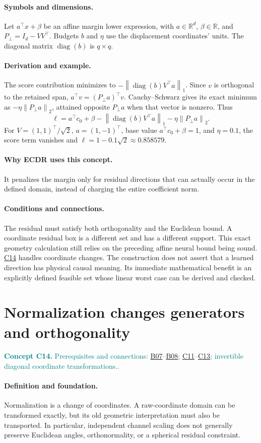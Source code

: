 \documentclass[11pt,a4paper]{article}
\newcommand{\R}{\mathbb R}
\newcommand{\norm}[1]{\left\lVert#1\right\rVert}
\newcommand{\diag}{\operatorname{diag}}
\newcommand{\conceptid}{Front matter}
\newcommand{\concept}[3]{\clearpage\renewcommand{\conceptid}{#1}%
\section{#2}\label{concept:#1}%
\textcolor{teal}{\textbf{Concept #1.} Prerequisites and connections: #3.}\par
\typeout{ECDR-CONCEPT-START #1 PAGE=\thepage}}
\begin{document}
\paragraph{Symbols and dimensions.}
Let $a^\top x+\beta$ be an affine margin lower expression, with $a\in\R^d$, $\beta\in\R$, and $P_\perp=I_d-VV^\top$. Budgets $b$ and $\eta$ use the displacement coordinates' units. The diagonal matrix $\diag(b)$ is $q\times q$.
\paragraph{Derivation and example.}
The score contribution minimizes to $-\norm{\diag(b)V^\top a}_1$. Since $v$ is orthogonal to the retained span, $a^\top v=(P_\perp a)^\top v$. Cauchy--Schwarz gives its exact minimum as $-\eta\norm{P_\perp a}_2$, attained opposite $P_\perp a$ when that vector is nonzero. Thus
\[
 \ell=a^\top c_0+\beta-\norm{\diag(b)V^\top a}_1
                  -\eta\norm{P_\perp a}_2.
\]
For $V=(1,1)^\top/\sqrt2$, $a=(1,-1)^\top$, base value $a^\top c_0+\beta=1$, and $\eta=0.1$, the score term vanishes and $\ell=1-0.1\sqrt2\approx0.858579$.
\paragraph{Why ECDR uses this concept.}
It penalizes the margin only for residual directions that can actually occur in the defined domain, instead of charging the entire coefficient norm.
\paragraph{Conditions and connections.}
The residual must satisfy both orthogonality and the Euclidean bound. A coordinate residual box is a different set and has a different support. This exact geometry calculation still relies on the preceding affine neural bound being sound. \hyperref[concept:C14]{C14} handles coordinate changes. The construction does not assert that a learned direction has physical causal meaning. Its immediate mathematical benefit is an explicitly defined feasible set whose linear worst case can be derived and checked.
\par\label{endconcept:C13}

\concept{C14}{Normalization changes generators and orthogonality}{\hyperref[concept:B07]{B07}--\hyperref[concept:B08]{B08}; \hyperref[concept:C11]{C11}--\hyperref[concept:C13]{C13}; invertible diagonal coordinate transformations.}
\paragraph{Definition and foundation.}
Normalization is a change of coordinates. A raw-coordinate domain can be transformed exactly, but its old geometric interpretation must also be transported. In particular, independent channel scaling does not generally preserve Euclidean angles, orthonormality, or a spherical residual constraint.
\end{document}

